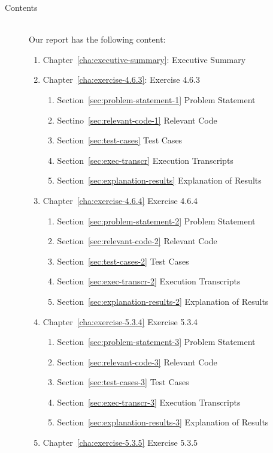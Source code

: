 \documentclass{report}
\begin{document}
\begin{description}
\item[Contents] \ \\
Our report has the following content:
\begin{enumerate}
 \item Chapter~\ref{cha:executive-summary}: Executive Summary
 \item Chapter~\ref{cha:exercise-4.6.3}: Exercise 4.6.3
   \begin{enumerate}
    \item Section~\ref{sec:problem-statement-1} Problem Statement
    \item Sectino~\ref{sec:relevant-code-1} Relevant Code
    \item Section~\ref{sec:test-cases} Test Cases
    \item Section~\ref{sec:exec-transcr} Execution Transcripts
    \item Section~\ref{sec:explanation-results} Explanation of Results
   \end{enumerate}
 \item Chapter~\ref{cha:exercise-4.6.4} Exercise 4.6.4
   \begin{enumerate}
    \item Section~\ref{sec:problem-statement-2} Problem Statement
    \item Section~\ref{sec:relevant-code-2} Relevant Code
    \item Section~\ref{sec:test-cases-2} Test Cases
    \item Section~\ref{sec:exec-transcr-2} Execution Transcripts
    \item Section~\ref{sec:explanation-results-2} Explanation of Results
    \end{enumerate}
 \item Chapter~\ref{cha:exercise-5.3.4} Exercise 5.3.4
   \begin{enumerate}
    \item Section~\ref{sec:problem-statement-3} Problem Statement
    \item Section~\ref{sec:relevant-code-3} Relevant Code
     \item Section~\ref{sec:test-cases-3} Test Cases
    \item Section~\ref{sec:exec-transcr-3} Execution Transcripts
    \item Section~\ref{sec:explanation-results-3} Explanation of Results
   \end{enumerate}
 \item Chapter~\ref{cha:exercise-5.3.5} Exercise 5.3.5

\end{enumerate}
\end{description}
\end{document}
